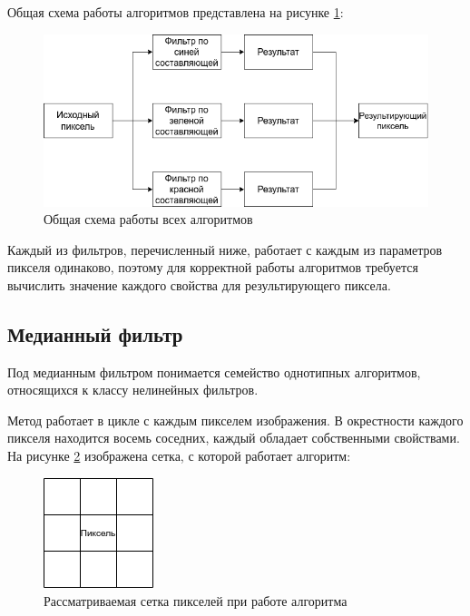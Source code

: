 Общая схема работы алгоритмов представлена на рисунке \ref{fig::allAlgs}:
\FloatBarrier
 \begin{figure}[h]	
 	\begin{center}
 		\includegraphics[width=\linewidth]{inc/png/allAlgs.png}
 	\end{center}
 	\captionsetup{justification=centering}
 	\caption{Общая схема работы всех алгоритмов}
 	\label{fig::allAlgs}
 \end{figure}
\FloatBarrier

Каждый из фильтров, перечисленный ниже, работает с каждым из параметров пикселя одинаково, поэтому для корректной работы алгоритмов требуется вычислить значение каждого свойства для результирующего пиксела.

\subsection{Медианный фильтр}
Под медианным фильтром понимается семейство однотипных алгоритмов, относящихся к классу нелинейных фильтров.

Метод работает в цикле с каждым пикселем изображения. 
В окрестности каждого пикселя находится восемь соседних, каждый обладает собственными свойствами. 
На рисунке \ref{fig::grid} изображена сетка, с которой работает алгоритм:

\FloatBarrier
\begin{figure}[h]	
	\begin{center}
		\includegraphics[]{inc/png/grid.png}
	\end{center}
	\captionsetup{justification=centering}
	\caption{Рассматриваемая сетка пикселей при работе алгоритма}
	\label{fig::grid}
\end{figure}
\FloatBarrier
\newpage

